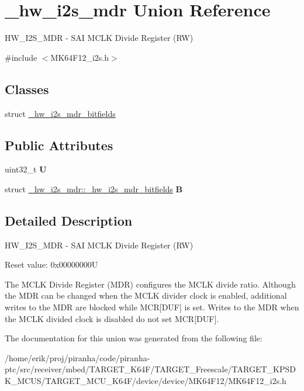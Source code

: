 \hypertarget{union__hw__i2s__mdr}{}\section{\+\_\+hw\+\_\+i2s\+\_\+mdr Union Reference}
\label{union__hw__i2s__mdr}


H\+W\+\_\+\+I2\+S\+\_\+\+M\+DR -\/ S\+AI M\+C\+LK Divide Register (RW)  




{\ttfamily \#include $<$M\+K64\+F12\+\_\+i2s.\+h$>$}

\subsection*{Classes}
\begin{DoxyCompactItemize}
\item 
struct \hyperlink{struct__hw__i2s__mdr_1_1__hw__i2s__mdr__bitfields}{\+\_\+hw\+\_\+i2s\+\_\+mdr\+\_\+bitfields}
\end{DoxyCompactItemize}
\subsection*{Public Attributes}
\begin{DoxyCompactItemize}
\item 
uint32\+\_\+t {\bfseries U}\hypertarget{union__hw__i2s__mdr_af0cfce1d32d6d9849754a325a01ceeed}{}\label{union__hw__i2s__mdr_af0cfce1d32d6d9849754a325a01ceeed}

\item 
struct \hyperlink{struct__hw__i2s__mdr_1_1__hw__i2s__mdr__bitfields}{\+\_\+hw\+\_\+i2s\+\_\+mdr\+::\+\_\+hw\+\_\+i2s\+\_\+mdr\+\_\+bitfields} {\bfseries B}\hypertarget{union__hw__i2s__mdr_a42867e859ec27c1a597d20b740d6fd0c}{}\label{union__hw__i2s__mdr_a42867e859ec27c1a597d20b740d6fd0c}

\end{DoxyCompactItemize}


\subsection{Detailed Description}
H\+W\+\_\+\+I2\+S\+\_\+\+M\+DR -\/ S\+AI M\+C\+LK Divide Register (RW) 

Reset value\+: 0x00000000U

The M\+C\+LK Divide Register (M\+DR) configures the M\+C\+LK divide ratio. Although the M\+DR can be changed when the M\+C\+LK divider clock is enabled, additional writes to the M\+DR are blocked while M\+CR\mbox{[}D\+UF\mbox{]} is set. Writes to the M\+DR when the M\+C\+LK divided clock is disabled do not set M\+CR\mbox{[}D\+UF\mbox{]}. 

The documentation for this union was generated from the following file\+:\begin{DoxyCompactItemize}
\item 
/home/erik/proj/piranha/code/piranha-\/ptc/src/receiver/mbed/\+T\+A\+R\+G\+E\+T\+\_\+\+K64\+F/\+T\+A\+R\+G\+E\+T\+\_\+\+Freescale/\+T\+A\+R\+G\+E\+T\+\_\+\+K\+P\+S\+D\+K\+\_\+\+M\+C\+U\+S/\+T\+A\+R\+G\+E\+T\+\_\+\+M\+C\+U\+\_\+\+K64\+F/device/device/\+M\+K64\+F12/M\+K64\+F12\+\_\+i2s.\+h\end{DoxyCompactItemize}
